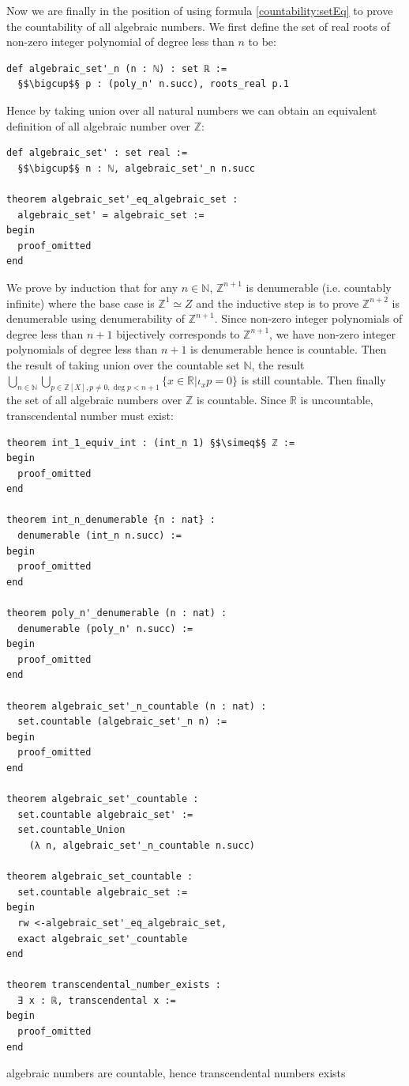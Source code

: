 \documentclass{report}
\theoremstyle{definition}
\newenvironment{code}{\captionsetup{type=listing}}{}
\begin{document}
Now we are finally in the position of using formula \ref{countability:setEq} to prove the countability of all algebraic numbers. We first define the set of real roots of non-zero integer polynomial of degree less than $n$ to be:
\begin{verbatim}
def algebraic_set'_n (n : ℕ) : set ℝ := 
  §$\bigcup$§ p : (poly_n' n.succ), roots_real p.1
\end{verbatim}
Hence by taking union over all natural numbers we can obtain an equivalent definition of all algebraic number over $\mathbb{Z}$:
\begin{verbatim}
def algebraic_set' : set real := 
  §$\bigcup$§ n : ℕ, algebraic_set'_n n.succ

theorem algebraic_set'_eq_algebraic_set : 
  algebraic_set' = algebraic_set :=
begin
  proof_omitted
end
\end{verbatim}
We prove by induction that for any $n\in\mathbb N$, $\mathbb{Z}^{n+1}$ is denumerable (i.e. countably infinite) where the base case is $\mathbb Z^1\simeq Z$ and the inductive step is to prove $\mathbb{Z}^{n+2}$ is denumerable using denumerability of $\mathbb{Z}^{n+1}$. Since non-zero integer polynomials of degree less than $n+1$ bijectively corresponds to $\mathbb{Z}^{n+1}$, we have non-zero integer polynomials of degree less than $n+1$ is denumerable hence is countable. Then the result of taking union over the countable set $\mathbb N$, the result $ \bigcup_{n\in\mathbb N}\bigcup_{p\in\mathbb{Z}[X], p\ne 0, \deg{p}<n+1} \{x\in\mathbb{R}|\iota_xp=0\}$ is still countable. Then finally the set of all algebraic numbers over $\mathbb Z$ is countable. Since $\mathbb R$ is uncountable, transcendental number must exist:
\begin{code}
\begin{verbatim}
theorem int_1_equiv_int : (int_n 1) §$\simeq$§ ℤ := 
begin
  proof_omitted
end

theorem int_n_denumerable {n : nat} :
  denumerable (int_n n.succ) :=
begin
  proof_omitted
end

theorem poly_n'_denumerable (n : nat) : 
  denumerable (poly_n' n.succ) :=
begin
  proof_omitted
end

theorem algebraic_set'_n_countable (n : nat) :
  set.countable (algebraic_set'_n n) :=
begin
  proof_omitted
end

theorem algebraic_set'_countable : 
  set.countable algebraic_set' :=
  set.countable_Union 
    (λ n, algebraic_set'_n_countable n.succ)

theorem algebraic_set_countable : 
  set.countable algebraic_set :=
begin
  rw <-algebraic_set'_eq_algebraic_set, 
  exact algebraic_set'_countable
end

theorem transcendental_number_exists : 
  ∃ x : ℝ, transcendental x :=
begin
  proof_omitted
end
\end{verbatim}
\caption{algebraic numbers are countable, hence transcendental numbers exists}
\end{code}
\end{document}
